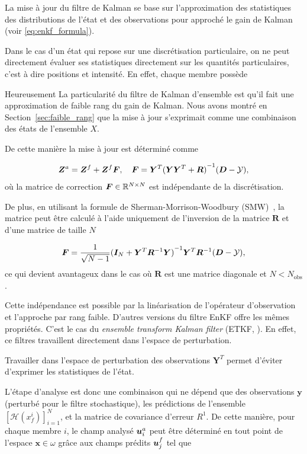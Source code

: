 La mise à jour du filtre de Kalman se base sur l'approximation des statistiques des distributions de l'état et des observations pour approché le gain de Kalman (voir \eqref{eq:enkf_formula}).

Dans le cas d'un état qui repose sur une discrétisation particulaire, on ne peut directement évaluer ses statistiques directement sur les quantités particulaires, c'est à dire positions et intensité. En effet, chaque membre possède


Heureusement La particularité du filtre de Kalman d'ensemble est qu'il fait une approximation de faible rang du gain de Kalman. Nous avons montré en Section~\ref{sec:faible_rang} que la mise à jour s'exprimait comme une combinaison des états de l'ensemble $X$.

De cette manière la mise à jour est déterminé comme

\begin{equation}
    \bm{Z}^a = \bm{Z}^f + \bm{Z}^f \bm{F}, \quad \bm{F} = \bm Y^T {(\bm Y \bm Y^T + \bm R)}^{-1}(\bm{D} - \mathcal{Y}),
\end{equation}où la matrice de correction $\bm{F} \in \mathbb{R}^{N\times N}$ est indépendante de la discrétisation.

De plus, en utilisant la formule de Sherman-Morrison-Woodbury (SMW)~\cite{SMW}, la matrice peut être calculé à l'aide uniquement de l'inversion de la matrice $\bm R$ et d'une matrice de taille $N$

\begin{equation*}
    \bm{F} = \frac{1}{\sqrt{N - 1}} {(\bm I_N + \bm Y^T\bm R^{-1}\bm Y)}^{-1}\bm Y^T \bm R^{-1} (\bm{D} - \mathcal{Y}),
\end{equation*}ce qui devient avantageux dans le cas où $\bm R$ est une matrice diagonale et $N < N_{\text{obs}}$.

Cette indépendance est possible par la linéarisation de l'opérateur d'observation et l'approche par rang faible. D'autres versions du filtre EnKF offre les mêmes propriétés. C'est le cas du \textit{ensemble transform Kalman filter} (ETKF, \cite{Hunt2007}). En effet, ce filtres travaillent directement dans l'espace de perturbation.

Travailler dans l'espace de perturbation des observations $\bm Y^T$ permet d'éviter d'exprimer les statistiques de l'état.

L'étape d'analyse est donc une combinaison qui ne dépend que des observations $\bm y$ (perturbé pour le filtre stochastique), les prédictions de l'ensemble $\left[\mathcal{H}(x^i_f)\right]_{i=1}^{N}$, et la matrice de covariance d'erreur $R^{1}$. De cette manière, pour chaque membre $i$, le champ analysé $\bm{u}_i^a$ peut être déterminé en tout point de l'espace $\bm x \in \omega$ grâce aux champs prédits $\bm{u}_j^f$ tel que

